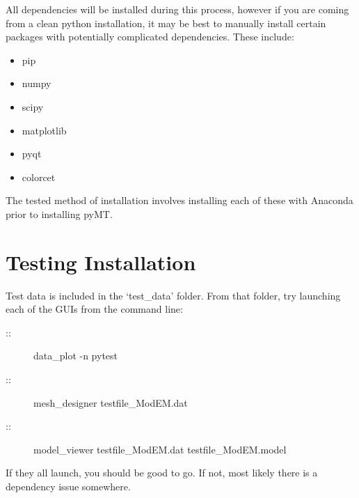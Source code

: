 \documentclass[letterpaper,10pt,english]{sphinxmanual}
\begin{document}
All dependencies will be installed during this process, however if you are coming from a clean python installation, it may be best to manually install certain packages with potentially complicated dependencies.
These include:
\begin{itemize}
\item {} 
pip

\item {} 
numpy

\item {} 
scipy

\item {} 
matplotlib

\item {} 
pyqt

\item {} 
colorcet

\end{itemize}

The tested method of installation involves installing each of these with Anaconda prior to installing pyMT.


\chapter{Testing Installation}
\label{\detokenize{content/api_core/testing_installation:testing-installation}}\label{\detokenize{content/api_core/testing_installation::doc}}
Test data is included in the ‘test\_data’ folder.
From that folder, try launching each of the GUIs from the command line:
\begin{description}
\item[{{\hyperref[\detokenize{content/data_plot/main_window:data-plot}]{}}::}] \leavevmode
data\_plot -n pytest

\item[{{\hyperref[\detokenize{content/mesh_designer/main_window:mesh-designer}]{}}::}] \leavevmode
mesh\_designer testfile\_ModEM.dat

\item[{{\hyperref[\detokenize{content/model_viewer/main_window:model-viewer}]{}}::}] \leavevmode
model\_viewer testfile\_ModEM.dat testfile\_ModEM.model

\end{description}

If they all launch, you should be good to go.
If not, most likely there is a dependency issue somewhere.
\end{document}
